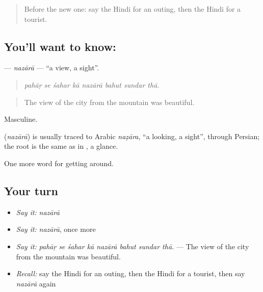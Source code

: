\label{lesson:HI-C451-nazara}



\begin{quote}
Before the new one: say the Hindi for an outing, then the Hindi for a tourist.
\end{quote}

\subsection*{You'll want to know: }
\textbf{} — \emph{nazārā} — \textquotedblleft{}a view, a sight\textquotedblright{}.

\begin{quote}
       
\end{quote}

\begin{quote}
\emph{pahāṛ se śahar kā nazārā bahut sundar thā.}
\end{quote}

\begin{quote}
The view of the city from the mountain was beautiful.
\end{quote}

Masculine.

\begin{cousinweb}
\textbf{} (\emph{nazārā}) is usually traced to Arabic \emph{naẓāra}, \textquotedblleft{}a looking, a sight\textquotedblright{}, through Persian; the root is the same as in , a glance.
\end{cousinweb}

\begin{grammarlens}[title={What you've built}]
One more word for getting around.
\end{grammarlens}

\subsection*{Your turn}
\begin{itemize}
\raggedright
  \item \emph{Say it:} \emph{nazārā}
  \item \emph{Say it:} \emph{nazārā}, once more
  \item \emph{Say it:} \emph{pahāṛ se śahar kā nazārā bahut sundar thā.} — The view of the city from the mountain was beautiful.
  \item \emph{Recall:} say the Hindi for an outing, then the Hindi for a tourist, then say \emph{nazārā} again
\end{itemize}

